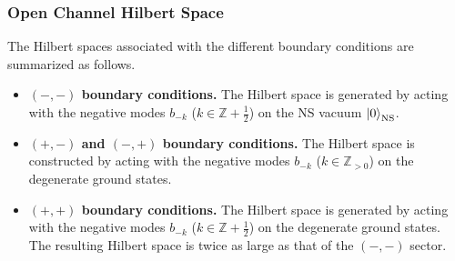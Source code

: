 %
%
%
\subsubsection{Open Channel Hilbert Space}

The Hilbert spaces associated with the different boundary conditions are summarized as follows.
\begin{itemize}
  \item \textbf{$(-,-)$ boundary conditions.}
  The Hilbert space is generated by acting with the negative modes $b_{-k}$ ($k \in \mathbb{Z}+\tfrac12$) on the NS vacuum $\ket{0}_{\mathrm{NS}}$.

  \item \textbf{$(+,-)$ and $(-,+)$ boundary conditions.}
  The Hilbert space is constructed by acting with the negative modes $b_{-k}$ ($k \in \mathbb{Z}_{>0}$) on the degenerate ground states.

  \item \textbf{$(+,+)$ boundary conditions.}
  The Hilbert space is generated by acting with the negative modes $b_{-k}$ ($k \in \mathbb{Z}+\tfrac12$) on the degenerate ground states. The resulting Hilbert space is twice as large as that of the $(-,-)$ sector.
\end{itemize}

%
%
%
%
%
%

